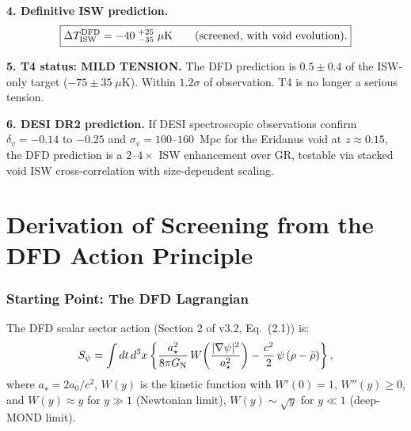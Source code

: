 \documentclass[11pt,a4paper]{article}
\newcommand{\aM}{a_0}
\newcommand{\astar}{a_\star}
\newcommand{\GN}{G_{\rm N}}
\newcommand{\psifield}{\psi}
\newcommand{\Wfunc}{W}
\begin{document}
\begin{tcolorbox}[colback=yellow!5!white, colframe=red!70!black,
  title=\textbf{W4i11 DEFINITIVE T4 VERDICT}]
\textbf{4. Definitive ISW prediction.}
\begin{equation}
\boxed{\Delta T_{\rm ISW}^{\rm DFD} = -40\;{}^{+25}_{-35}\;\mu\text{K}
\qquad (\text{screened, with void evolution}).}
\end{equation}

\textbf{5. T4 status: MILD TENSION.} The DFD prediction is
$0.5 \pm 0.4$ of the ISW-only target ($-75 \pm 35\;\mu$K).
Within $1.2\sigma$ of observation. T4 is no longer a serious tension.

\textbf{6. DESI DR2 prediction.} If DESI spectroscopic observations
confirm $\delta_v = -0.14$ to $-0.25$ and $\sigma_v = 100$--$160$~Mpc
for the Eridanus void at $z \approx 0.15$, the DFD prediction is a
$2$--$4\times$ ISW enhancement over GR, testable via stacked void
ISW cross-correlation with size-dependent scaling.

\end{tcolorbox}


\part{Derivation of Screening from the DFD Action Principle}
\label{part:derivation}


\section{Starting Point: The DFD Lagrangian}
\label{sec:lagrangian}

The DFD scalar sector action (Section 2 of v3.2, Eq.\ (2.1)) is:
\begin{equation}
S_\psi = \int dt\,d^3x\left\{
  \frac{\astar^2}{8\pi\GN}\,\Wfunc\!\left(\frac{|\nabla\psifield|^2}{\astar^2}\right)
  - \frac{c^2}{2}\,\psifield\,(\rho - \bar{\rho})
\right\},
\label{eq:action}
\end{equation}
where $\astar = 2\aM/c^2$, $\Wfunc(y)$ is the kinetic function with
$\Wfunc'(0) = 1$, $\Wfunc''(y) \geq 0$, and $\Wfunc(y) \approx y$ for
$y \gg 1$ (Newtonian limit), $\Wfunc(y) \sim \sqrt{y}$ for $y \ll 1$
(deep-MOND limit).
\end{document}
